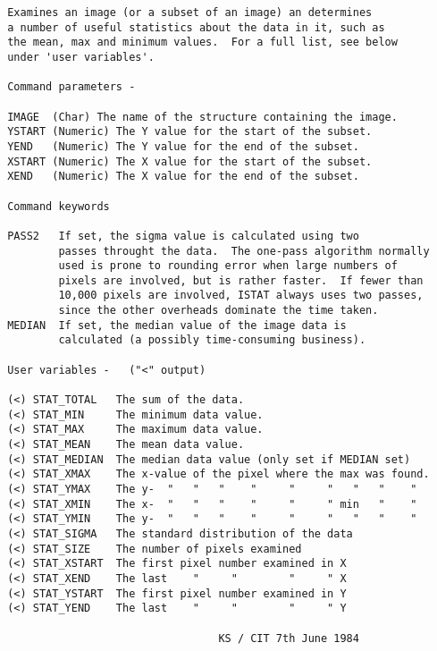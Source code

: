 \begin{description}
\begin{verbatim}
 Examines an image (or a subset of an image) an determines
 a number of useful statistics about the data in it, such as
 the mean, max and minimum values.  For a full list, see below
 under 'user variables'.

 Command parameters -

 IMAGE  (Char) The name of the structure containing the image.
 YSTART (Numeric) The Y value for the start of the subset.
 YEND   (Numeric) The Y value for the end of the subset.
 XSTART (Numeric) The X value for the start of the subset.
 XEND   (Numeric) The X value for the end of the subset.

 Command keywords

 PASS2   If set, the sigma value is calculated using two
         passes throught the data.  The one-pass algorithm normally
         used is prone to rounding error when large numbers of
         pixels are involved, but is rather faster.  If fewer than
         10,000 pixels are involved, ISTAT always uses two passes,
         since the other overheads dominate the time taken.
 MEDIAN  If set, the median value of the image data is
         calculated (a possibly time-consuming business).

 User variables -   ("<" output)

 (<) STAT_TOTAL   The sum of the data.
 (<) STAT_MIN     The minimum data value.
 (<) STAT_MAX     The maximum data value.
 (<) STAT_MEAN    The mean data value.
 (<) STAT_MEDIAN  The median data value (only set if MEDIAN set)
 (<) STAT_XMAX    The x-value of the pixel where the max was found.
 (<) STAT_YMAX    The y-  "   "   "    "     "     "   "   "    "
 (<) STAT_XMIN    The x-  "   "   "    "     "     " min   "    "
 (<) STAT_YMIN    The y-  "   "   "    "     "     "   "   "    "
 (<) STAT_SIGMA   The standard distribution of the data
 (<) STAT_SIZE    The number of pixels examined
 (<) STAT_XSTART  The first pixel number examined in X
 (<) STAT_XEND    The last    "     "        "     " X
 (<) STAT_YSTART  The first pixel number examined in Y
 (<) STAT_YEND    The last    "     "        "     " Y

                                  KS / CIT 7th June 1984
\end{verbatim}
\end{description}
